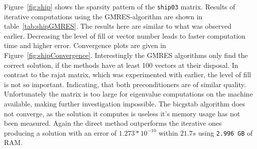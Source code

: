 Figure~\ref{fig:ship} shows the sparsity pattern of the \texttt{ship03} matrix. Results of iterative computations using the GMRES-algorithm are shown in table~\ref{tab:shipGMRES}. The results here are similar to what was observed earlier. Decreasing the level of fill or vector number leads to faster computation time and higher error. Convergence plots are given in Figure~\ref{fig:shipConvergence}. Interestingly the  GMRES algorithms only find the correct solution, if the methods have at least 100 vectors at their disposal. In contrast to the rajat matrix, which was experimented with earlier, the level of fill is not so important. Indicating, that both preconditioners are of similar quality. Unfortunately the matrix is too large for eigenvalue computations on the machine available, making further investigation impossible. The bicgstab algorithm does not converge, as the solution it computes is useless it's memory usage has not been measured. Again the direct method outperforms the iterative ones producing a solution with an error of $1.273*10^{-10}$ within $21.7s$ using \texttt{2.996 GB} of RAM.


